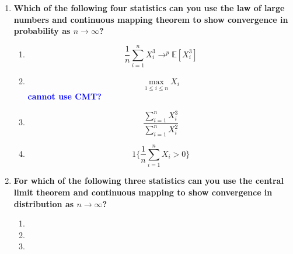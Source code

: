 \documentclass[]{article}
\newcommand{\sumin}{\sum\limits_{i=1}^n} %
\newcommand{\E}{\mathbb{E}}
\newcommand{\fix} [1] {\textbf{\textcolor{blue}{#1}}} %
\begin{document}
\begin{enumerate}[label = (\roman*)]

\item \textbf{Which of the following four statistics can you use the law of large numbers and continuous mapping theorem to show convergence in probability as $n \rightarrow \infty$?}
\begin{enumerate}[label = (\alph*)]

\item  \[\frac{1}{n}\sumin X_i^3 \rightarrow^p \E[X_i^3]\]

\item \[\max_{1\le i \le n} X_i\] \fix{cannot use CMT?}

\item \[ \frac{\sumin X_i^3}{\sumin X_i^2}\]

\item \[ 1 \bigg\{\frac{1}{n}\sumin X_i > 0\bigg\}\]

\end{enumerate}

\item \textbf{For which of the following three statistics can you use the central limit theorem and continuous mapping to show convergence in distribution as $n \rightarrow \infty$?}

\begin{enumerate}[label = (\alph*)]
\item 

\item

\item 

\end{enumerate}


\end{enumerate}
\end{document}
